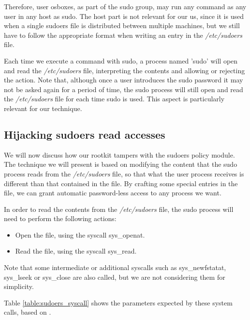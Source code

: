 Therefore, user osboxes, as part of the sudo group, may run any command as any user in any host as sudo. The host part is not relevant for our us, since it is used when a single sudoers file is distributed between multiple machines, but we still have to follow the appropriate format when writing an entry in the \textit{/etc/sudoers} file.

Each time we execute a command with sudo, a process named 'sudo' will open and read the \textit{/etc/sudoers} file, interpreting the contents and allowing or rejecting the action. Note that, although once a user introduces the sudo password it may not be asked again for a period of time, the sudo process will still open and read the \textit{/etc/sudoers} file for each time sudo is used. This aspect is particularly relevant for our technique.


\subsection{Hijacking sudoers read accesses}
We will now discuss how our rootkit tampers with the sudoers policy module. The technique we will present is based on modifying the content that the sudo process reads from the \textit{/etc/sudoers} file, so that what the user process receives is different than that contained in the file. By crafting some special entries in the file, we can grant automatic password-less access to any process we want.

In order to read the contents from the \textit{/etc/sudoers} file, the sudo process will need to perform the following actions:
\begin{itemize}
\item Open the file, using the syscall sys\_openat.
\item Read the file, using the syscall sys\_read.
\end{itemize}

Note that some intermediate or additional syscalls such as sys\_newfstatat, sys\_lseek or sys\_close are also called, but we are not considering them for simplicity.

Table \ref{table:sudoers_syscall} shows the parameters expected by these system calls, based on \cite{syscall_reference}.

